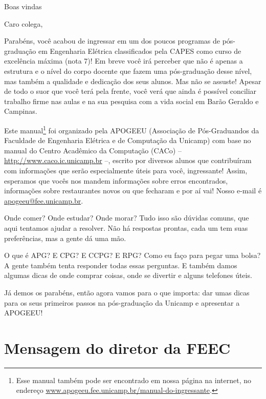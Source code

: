 
\setcounter{page}{1}

\begin{story}{Boas vindas}

Caro colega,

Parabéns, você acabou de ingressar em um dos poucos programas de pós-graduação em Engenharia Elétrica classificados pela CAPES como curso de excelência máxima (nota 7)! Em breve você irá perceber que não é apenas a estrutura e o nível do corpo docente que fazem uma pós-graduação desse nível, mas também a qualidade e dedicação dos seus alunos. Mas não se assuste! Apesar de todo o suor que você terá pela frente, você verá que ainda é possível conciliar trabalho firme nas aulas e na sua pesquisa com a vida social em Barão Geraldo e Campinas.

Este manual\footnote{Esse manual também pode ser encontrado em nossa página na internet, no endereço \url{www.apogeeu.fee.unicamp.br/manual-do-ingressante}.} foi organizado pela APOGEEU (Associação de Pós-Graduandos da Faculdade de Engenharia Elétrica e de Computação da Unicamp) com base no manual do Centro Acadêmico da Computação (CACo) -- \url{http://www.caco.ic.unicamp.br} --, escrito por diversos alunos que contribuíram com informações que serão especialmente úteis para você, ingressante! Assim, esperamos que vocês nos mandem informações sobre erros encontrados, informações sobre restaurantes novos ou que fecharam e por aí vai! Nosso e-mail é \url{apogeeu@fee.unicamp.br}.

Onde comer? Onde estudar? Onde morar? Tudo isso são dúvidas comuns, que aqui tentamos ajudar a resolver. Não há respostas prontas, cada um tem suas preferências, mas a gente dá uma mão.

O que é APG? E CPG? E CCPG? E RPG? Como eu faço para pegar uma bolsa? A gente também tenta responder todas essas perguntas. E também damos algumas dicas de onde comprar coisas, onde se divertir e alguns telefones úteis.

Já demos os parabéns, então agora vamos para o que importa: dar umas dicas para os seus primeiros passos na pós-graduação da Unicamp e apresentar a APOGEEU!

\section*{Mensagem do diretor da FEEC}


\end{story}
